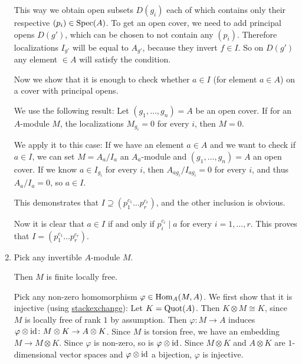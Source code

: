 \begin{exercise}{1}
\begin{enumerate}
{                This way we obtain open subsets $D(g_i)$ each of which contains
                only their respective $(p_i) \in \operatorname{Spec}(A)$. To get an open
                cover, we need to add principal opens $D(g')$, which can be
                chosen to not contain any $(p_i)$. Therefore localizations
                $I_{g'}$ will be equal to $A_{g'}$, because they invert $f \in
                I$. So on $D(g')$ any element $\in A$ will satisfy the
                condition.

                Now we show that it is enough to check whether $a \in I$ (for
                element $a \in A$) on a cover with principal opens.

                We use the following result:
                Let $(g_1, \dots, g_n) = A$ be an open cover.
                If for an $A$-module $M$, the localizations $M_{g_i} = 0$ for every
                $i$, then $M = 0$.

                We apply it to this case:
                If we have an element $a \in A$ and we want to check if $a
                \in I$, we can set $M = A_a/I_a$ an $A_a$-module and $(g_1,
                \dots, g_n) = A$ an open cover. If we know $a \in I_{g_i}$ for
                every $i$, then $A_{a g_i} / I_{a g_i} = 0$ for every $i$, and
                thus $A_a/I_a = 0$, so $a \in I$.

                This demonstrates that $I \supseteq (p^{c_1}_1 \dots
                p^{c_r}_r)$, and the other inclusion is obvious.

                Now it is clear that $a \in I$ if and only if $p^{c_i}_i \mid a$
                for every $i = 1, \dots, r$. This proves that $I = (p^{c_1}_1
                \dots p^{c_r}_r)$.
            }
        \item{
                Pick any invertible $A$-module $M$.

                Then $M$ is finite locally free. 

                Pick any non-zero homomorphism $\varphi \in \operatorname{Hom}_A(M, A)$.
                We first show that it is injective (using
                \href{https://math.stackexchange.com/questions/4325769/picard-group-of-ufd-is-trivial}{stackexchange}):
                Let $K = \operatorname{Quot}(A)$. Then $K \otimes M \cong K$, since $M$ is
                locally free of rank $1$ by assumption. Then $\varphi \colon M
                \to A$ induces $\varphi \otimes \operatorname{id} \colon M \otimes K \to A
                \otimes K$. Since $M$ is torsion free, we have an embedding $M
                \to M \otimes K$. Since $\varphi$ is non-zero, so is $\varphi
                \otimes \operatorname{id}$. Since $M \otimes K$ and $A \otimes K$ are
                $1$-dimensional vector spaces and $\varphi \otimes \operatorname{id}$ a
                bijection, $\varphi$ is injective.

}
\end{enumerate}
\end{exercise}
